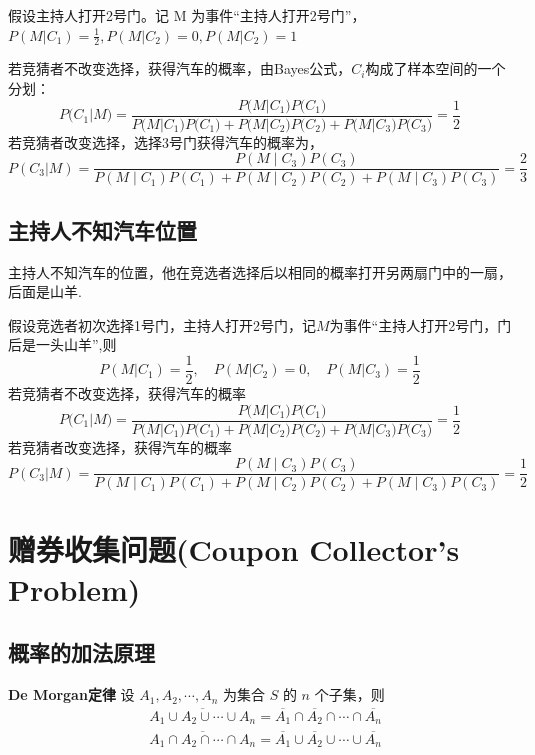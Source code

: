\documentclass[10t, a4paper, oneside]{ctexbook}
\begin{document}
假设主持人打开2号门。记 M 为事件“主持人打开2号门”， $P(M|C_1)= \frac12, P(M|C_2) = 0, P(M|C_2)= 1$

若竞猜者不改变选择，获得汽车的概率，由Bayes公式，$C_i$构成了样本空间的一个分划：
$$P\big(C_1|M\big)=\frac{P\big(M|C_1\big)P\big(C_1\big)}{P\big(M|C_1\big)P\big(C_1\big)+P\big(M|C_2\big)P\big(C_2\big)+P\big(M|C_3\big)P\big(C_3\big)} = \frac12$$
若竞猜者改变选择，选择3号门获得汽车的概率为，
$$P\left(C_{3}|M\right)={\frac{P\left(M\mid C_{3}\right)P\left(C_{3}\right)}{P\left(M\mid C_{1}\right)P\left(C_{1}\right)+P\left(M\mid C_{2}\right)P\left(C_{2}\right)+P\left(M\mid C_{3}\right)P\left(C_{3}\right)}}=\frac23$$
\subsection{主持人不知汽车位置}
主持人不知汽车的位置，他在竞选者选择后以相同的概率打开另两扇门中的一扇，后面是山羊.

假设竞选者初次选择1号门，主持人打开2号门，记$M$为事件“主持人打开2号门，门后是一头山羊”,则$$P(M|C_1) = \frac12, \quad P(M|C_2) = 0, \quad P(M|C_3) = \frac{1}{2}$$
若竞猜者不改变选择，获得汽车的概率
$$P\big(C_1|M\big)=\frac{P\big(M|C_1\big)P\big(C_1\big)}{P\big(M|C_1\big)P\big(C_1\big)+P\big(M|C_2\big)P\big(C_2\big)+P\big(M|C_3\big)P\big(C_3\big)} = \frac12$$
若竞猜者改变选择，获得汽车的概率
$$P\left(C_{3}|M\right)={\frac{P\left(M\mid C_{3}\right)P\left(C_{3}\right)}{P\left(M\mid C_{1}\right)P\left(C_{1}\right)+P\left(M\mid C_{2}\right)P\left(C_{2}\right)+P\left(M\mid C_{3}\right)P\left(C_{3}\right)}}=\frac12$$

\section{赠券收集问题(Coupon Collector's Problem)}
\subsection{概率的加法原理}

\textbf{De Morgan定律}
设 $A_1,A_2,\cdots,A_n$ 为集合 $S$ 的 $n$ 个子集，则 $$\begin{aligned}&\overline{A_1\cup A_2\cup\cdots\cup A_n}={\overline{A_1}\cap \overline{A_2}\cap\cdots\cap \overline{A_n}}\\
    &\overline{A_{1}\cap A_{2}\cap\cdots\cap A_{n}}=\overline{A_{1}}\cup\overline{A_{2}}\cup\cdots\cup\overline{A_{n}}\end{aligned}$$
\end{document}
